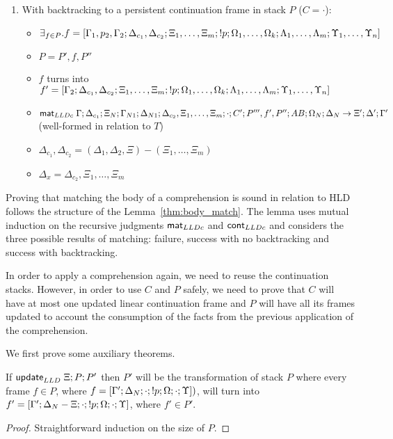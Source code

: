{\begin{lemma}
\begin{enumerate}
\begin{enumerate}
      \item With backtracking to a persistent continuation frame in stack $P$
      ($C = \cdot$):

      \begin{itemize}
         \item $\exists_{f \in P}. f = [\Gamma_1, p_2, \Gamma_2; \Delta_{c_1},
         \Delta_{c_2}; \Xi_1, \dotsc, \Xi_m; {!} p; \Omega_1, \dotsc, \Omega_k;
         \Lambda_1, \dotsc, \Lambda_m; \Upsilon_1, \dotsc, \Upsilon_n]$
         \item $P = P', f, P''$
         \item $f$ turns into $f' = [\Gamma_2; \Delta_{c_1}, \Delta_{c_2};
         \Xi_1, \dotsc, \Xi_m; {!} p; \Omega_1, \dotsc, \Omega_k; \Lambda_1,
         \dotsc, \Lambda_m; \Upsilon_1, \dotsc, \Upsilon_n]$
         \item $\mathsf{mat}_{LLDc} \; \Gamma; \Delta_{c_1}; \Xi_N; \Gamma_{N1}; \Delta_{N1};
            \Delta_{c_2}, \Xi_1, \dotsc, \Xi_m; \cdot; C'; P''', f', P'';
            AB; \Omega_N; \Delta_N \rightarrow \Xi'; \Delta'; \Gamma'$ (well-formed in relation to $T$)
         \item $\Delta_{c_1}, \Delta_{c_2} = (\Delta_1, \Delta_2, \Xi) - (\Xi_1,
               \dotsc, \Xi_m)$
         \item $\Delta_x = \Delta_{c_2}, \Xi_1, \dotsc, \Xi_m$
      \end{itemize}

   \end{enumerate}
\end{enumerate}
\end{lemma}
}

Proving that matching the body of a comprehension is sound in relation to HLD
follows the structure of the Lemma~\ref{thm:body_match}. The lemma uses mutual
induction on the recursive judgments $\mathsf{mat}_{LLDc} \;$and $\mathsf{cont}_{LLDc} \;$and considers the three
possible results of matching: failure, success with no backtracking and success
with backtracking.

In order to apply a comprehension again, we need to reuse the continuation
stacks. However, in order to use $C$ and $P$ safely, we need to prove that $C$
will have at most one updated linear continuation frame and $P$ will have all
its frames updated to account the consumption of the facts from the previous
application of the comprehension.

We first prove some auxiliary theorems.

\begin{theorem}\label{thm:stack_update}
If $\mathsf{update}_{LLD} \; \Xi; P; P'$ then $P'$ will be the transformation of stack $P$ where
every frame $f \in P$, where $f = [\Gamma'; \Delta_N; \cdot; {!} p; \Omega; \cdot;
      \Upsilon])$, will turn into $f' = [\Gamma'; \Delta_N - \Xi; \cdot;
      {!} p; \Omega; \cdot; \Upsilon]$, where $f' \in P'$.
\end{theorem}
\begin{proof}
Straightforward induction on the size of $P$.
\end{proof}


